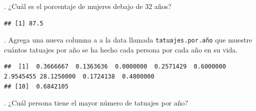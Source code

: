 \documentclass[
]{book}
\newenvironment{Shaded}{\begin{snugshade}}{\end{snugshade}}
\newcommand{\DecValTok}[1]{\textcolor[rgb]{0.00,0.00,0.81}{#1}}
\newcommand{\FunctionTok}[1]{\textcolor[rgb]{0.13,0.29,0.53}{\textbf{#1}}}
\newcommand{\NormalTok}[1]{#1}
\newcommand{\OtherTok}[1]{\textcolor[rgb]{0.56,0.35,0.01}{#1}}
\newcommand{\SpecialCharTok}[1]{\textcolor[rgb]{0.81,0.36,0.00}{\textbf{#1}}}
\newcommand{\StringTok}[1]{\textcolor[rgb]{0.31,0.60,0.02}{#1}}
\begin{document}
\hfill{}.
¿Cuál es el porcentaje de mujeres debajo de 32 años?\\

\begin{Shaded}
\end{Shaded}

\begin{verbatim}
## [1] 87.5
\end{verbatim}

\hfill{}.
Agrega una nueva columna a a la data llamada \texttt{tatuajes.por.año} que muestre cuántos tatuajes por año se ha hecho cada persona por cada año en su vida.\\

\begin{Shaded}
\end{Shaded}

\begin{verbatim}
##  [1]  0.3666667  0.1363636  0.0000000  0.2571429  0.6000000  2.9545455 28.1250000  0.1724138  0.4800000
## [10]  0.6842105
\end{verbatim}

\hfill{}.
¿Cuál persona tiene el mayor número de tatuajes por año?\\

\begin{Shaded}
\end{Shaded}
\end{document}
